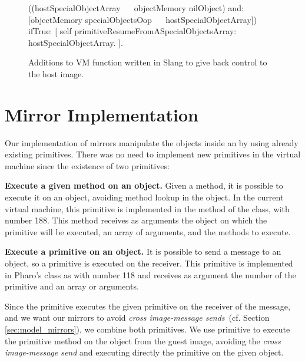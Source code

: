 \begin{figure}[htb]
\begin{code}
((hostSpecialObjectArray ~~ objectMemory nilObject)
    and:
[objectMemory specialObjectsOop ~~ hostSpecialObjectArray])
        ifTrue: [ 
            self primitiveResumeFromASpecialObjectsArray:
                       hostSpecialObjectArray.
        ].
\end{code}
\caption{Additions to VM function \textbf{} written in Slang to give back control to the host image.
\label{code:heartbeat_contextswitch}}
\end{figure}


\section{Mirror Implementation}\label{sec:implementation_mirrors}

Our implementation of mirrors manipulate the objects inside an \objectspace by using already existing primitives. There was no need to implement new primitives in the virtual machine since the existence of two primitives:
\begin{description}
	\item \textbf{Execute a given method on an object.} Given a method, it is possible to execute it on an object, avoiding method lookup in the object. In the current virtual machine, this primitive is implemented in the method \textbf{} of the  class, with number 188. This method receives as arguments the object on which the primitive will be executed, an array of arguments, and the methods to execute.
	\item \textbf{Execute a primitive on an object.} It is possible to send a message to an object, so a primitive is executed on the receiver. This primitive is implemented in Pharo's  class as \textbf{} with number 118 and receives as argument the number of the primitive and an array or arguments.
\end{description}

Since the primitive  executes the given primitive on the receiver of the message, and we want our mirrors to avoid \emph{cross image-message sends}~(cf. Section \ref{sec:model_mirrors}), we combine both primitives. We use primitive  to execute the primitive method  on the object from the guest image, avoiding the \emph{cross image-message send} and executing directly the primitive on the given object.

